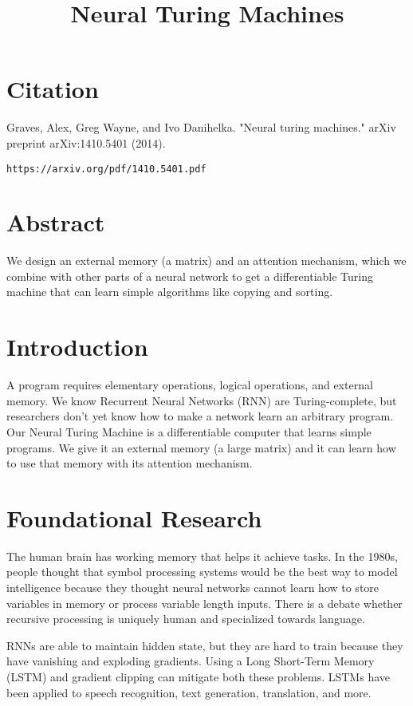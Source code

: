 \documentclass[a4paper]{article}
\title{Neural Turing Machines}
\date{}
\begin{document}
\maketitle

\section{Citation}
Graves, Alex, Greg Wayne, and Ivo Danihelka. "Neural turing machines." arXiv preprint arXiv:1410.5401 (2014).

\begin{verbatim}
https://arxiv.org/pdf/1410.5401.pdf
\end{verbatim}

\section{Abstract}
We design an external memory (a matrix) and an attention mechanism, which we
combine with other parts of a neural network to get a differentiable Turing
machine that can learn simple algorithms like copying and sorting.

\section{Introduction}
A program requires elementary operations, logical operations, and external
memory. We know Recurrent Neural Networks (RNN) are Turing-complete, but
researchers don't yet know how to make a network learn an arbitrary program.
Our Neural Turing Machine is a differentiable computer that learns simple
programs. We give it an external memory (a large matrix) and it can learn
how to use that memory with its attention mechanism.

\section{Foundational Research}
The human brain has working memory that helps it achieve tasks. In the 1980s,
people thought that symbol processing systems would be the best way to
model intelligence because they thought neural networks cannot learn how to
store variables in memory or process variable length inputs. There is a debate
whether recursive processing is uniquely human and specialized towards language.

RNNs are able to maintain hidden state, but they are hard to train because
they have vanishing and exploding gradients. Using a Long Short-Term Memory
(LSTM) and gradient clipping can mitigate both these problems. LSTMs have been
applied to speech recognition, text generation, translation, and more.
\end{document}
